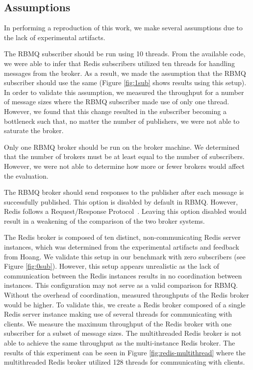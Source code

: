 \documentclass[letterpaper,twocolumn,10pt]{article}
\begin{document}
\subsection{Assumptions}
In performing a reproduction of this work, we make several assumptions due to the lack of experimental artifacts.

The RBMQ subscriber should be run using 10 threads.
From the available code, we were able to infer that Redis subscribers utilized ten threads for handling messages from the broker.
As a result, we made the assumption that the RBMQ subscriber should use the same (Figure \ref{fig:1sub} shows results using this setup).
In order to validate this assumption, we measured the throughput for a number of message sizes where the RBMQ subscriber made use of only one thread.
However, we found that this change resulted in the subscriber becoming a bottleneck such that, no matter the number of publishers, we were not able to saturate the broker.

Only one RBMQ broker should be run on the broker machine.
We determined that the number of brokers must be at least equal to the number of subscribers.
However, we were not able to determine how more or fewer brokers would affect the evaluation.

The RBMQ broker should send responses to the publisher after each message is successfully published.
This option is disabled by default in RBMQ.
However, Redis follows a Request/Response Protocol~\cite{redis-req-resp}.
Leaving this option disabled would result in a weakening of the comparison of the two broker systems.

The Redis broker is composed of ten distinct, non-communicating Redis server instances, which was determined from the experimental artifacts and feedback from Hoang.
We validate this setup in our benchmark with zero subscribers (see Figure \ref{fig:0sub}).
However, this setup appears unrealistic as the lack of communication between the Redis instances results in no coordination between instances. This configuration may not serve as a valid comparison for RBMQ.
Without the overhead of coordination, measured throughputs of the Redis broker would be higher.
To validate this, we create a Redis broker composed of a single Redis server instance making use of several threads for communicating with clients.
We measure the maximum throughput of the Redis broker with one subscriber for a subset of message sizes.
The multithreaded Redis broker is not able to achieve the same throughput as the multi-instance Redis broker.
The results of this experiment can be seen in Figure \ref{fig:redis-multithread} where the multithreaded Redis broker utilized 128 threads for communicating with clients.
\end{document}
